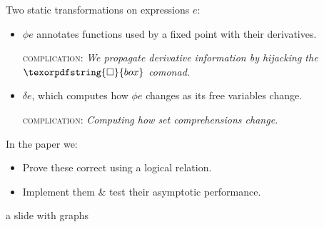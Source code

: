 \documentclass[aspectratio=169,dvipsnames]{beamer}
\providecommand\strong[1]{{\bfseries#1}}
\newcommand\iso{{\texorpdfstring{\ensuremath{\square}}{box}}}
\newcommand\fix{\n{fix}}
\newcommand\semifix{\n{semifix}}
\newcommand\hilite{\color{Rhodamine}}
\newcommand\hi[1]{{\hilite#1}}
\begin{document}


  \begin{frame}

    Two static transformations on expressions $e$:
    \vspace{1ex}
    \begin{itemize}
    \item \hi{$\phi e$} annotates functions used by a fixed point with their
      derivatives.\\[1ex]

      {\normalsize\sffamily\textsc{complication:} \it We propagate
        derivative information by hijacking the $\iso$ comonad.\par}

    \item \hi{$\delta e$}, which computes how $\phi e$ changes as
      its free variables change.
      \\[1ex]
      {\normalsize\sffamily\textsc{complication:}
        \it Computing how set comprehensions change.
        \par}
    \end{itemize}
    \vspace{1ex}

    In the paper we:\vspace{1ex}
    \begin{itemize}
    \item Prove these correct using a logical relation.
    \item Implement them \& test their asymptotic performance.
    \end{itemize}
    \vspace{\baselineskip}
  \end{frame}


  \begin{frame}
    \centering\Huge\color{red} a slide with graphs
  \end{frame}
\end{document}
